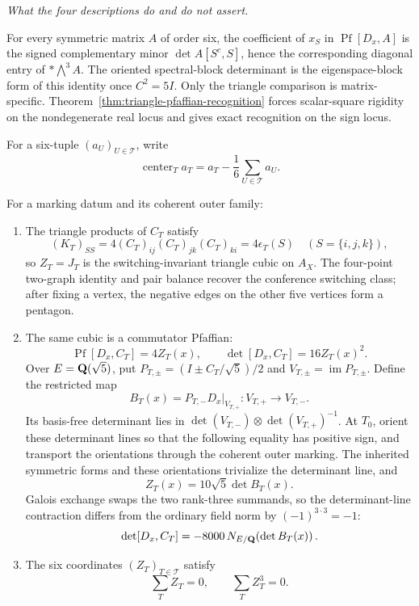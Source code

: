 \smallskip
\noindent\emph{What the four descriptions do and do not assert.}\par
For every symmetric matrix \(A\) of order six, the coefficient of \(x_S\) in
\(\operatorname{Pf}[D_x,A]\) is the signed complementary minor
\(\det A[S^c,S]\), hence the corresponding diagonal entry of
\(*\!\bigwedge^3A\).  The oriented spectral-block determinant is the
eigenspace-block form
of this identity once \(C^2=5I\).  Only the triangle comparison is
matrix-specific.
Theorem~\ref{thm:triangle-pfaffian-recognition} forces scalar-square rigidity
on the nondegenerate real locus and gives exact recognition on the sign locus.

For a six-tuple \((a_U)_{U\in\mathcal T}\), write
\[
 \operatorname{center}_T a_T
 =a_T-\frac16\sum_{U\in\mathcal T}a_U.
\]

\begin{theorem}
\label{thm:operator-shadows}
For a marking datum and its coherent outer family:
\begin{enumerate}
\item The triangle products of \(C_T\) satisfy
\[
 (K_T)_{SS}=4(C_T)_{ij}(C_T)_{jk}(C_T)_{ki}=4\epsilon_T(S)
 \quad(S=\{i,j,k\}),
\]
so \(Z_T=J_T\) is the switching-invariant triangle cubic on \(A_X\).
The four-point two-graph identity and pair balance recover the conference
switching class; after fixing a vertex, the negative edges on the other five
vertices form a pentagon.
\item The same cubic is a commutator Pfaffian:
\[
 \operatorname{Pf}[D_x,C_T]=4Z_T(x),
 \qquad
 \det[D_x,C_T]=16Z_T(x)^2.
\]
Over \(E=\mathbf Q(\sqrt5)\), put
\(P_{T,\pm}=(I\pm C_T/\sqrt5)/2\) and
\(V_{T,\pm}=\operatorname{im}P_{T,\pm}\).  Define the restricted map
\[
 B_T(x)=P_{T,-}D_x\big|_{V_{T,+}}:V_{T,+}\longrightarrow V_{T,-}.
\]
Its basis-free determinant lies in
\(\det(V_{T,-})\otimes\det(V_{T,+})^{-1}\).  At \(T_0\), orient these
determinant lines so that the following equality has positive sign, and
transport the orientations through the coherent outer marking.  The inherited
symmetric forms and these orientations trivialize the determinant line, and
\[
 Z_T(x)=10\sqrt5\det B_T(x).
\]
Galois exchange swaps the two rank-three summands, so the determinant-line
contraction differs from the ordinary field norm by \((-1)^{3\cdot3}=-1\):
\[
 \det[D_x,C_T]
 =-8000\,N_{E/\mathbf Q}\!\left(\det B_T(x)\right).
\]
\item The six coordinates \((Z_T)_{T\in\mathcal T}\) satisfy
\[
 \sum_TZ_T=0,\qquad \sum_TZ_T^3=0.
\]
\end{enumerate}
\end{theorem}
